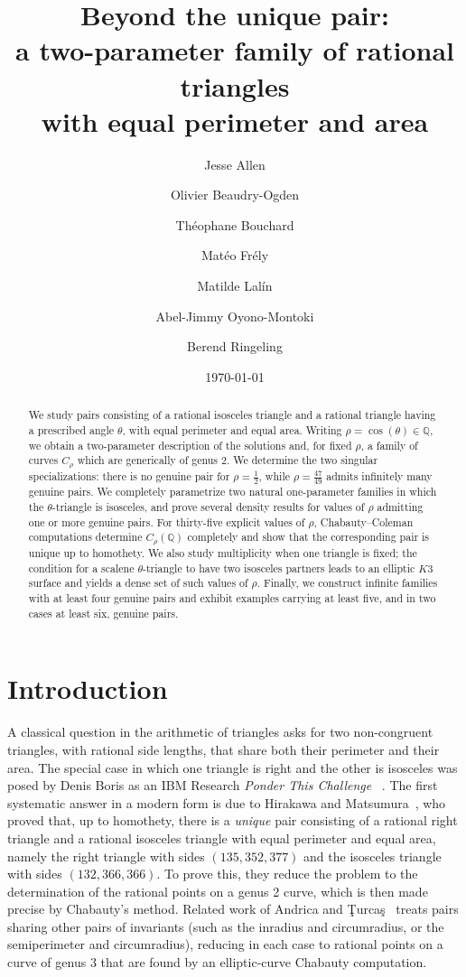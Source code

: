 \documentclass[11pt]{amsart}
\title[A two-parameter family of rational triangles
       with equal perimeter and area] {Beyond the unique pair:\\
       a two-parameter family of rational triangles\\
       with equal perimeter and area}
\author[Allen]{Jesse Allen}
\author[Beaudry-Ogden]{Olivier Beaudry-Ogden}
\author[Bouchard]{Th\'eophane Bouchard}
\author[Fr\'ely]{Mat\'eo Fr\'ely}
\author[Lal\'in]{Matilde Lal\'in}
\author[Oyono-Montoki]{Abel-Jimmy Oyono-Montoki}
\author[Ringeling]{Berend Ringeling}
\date{\today}
\theoremstyle{plain}
\theoremstyle{remark}
\theoremstyle{plain}
\newcommand{\Q}{\mathbb{Q}}
\begin{document}


\maketitle
\begin{abstract}
We study pairs consisting of a rational isosceles triangle and a
rational triangle having a prescribed angle $\theta$, with equal
perimeter and equal area. Writing $\rho=\cos(\theta)\in\Q$, we obtain a
two-parameter description of the solutions and, for fixed $\rho$, a
family of curves $C_\rho$ which are generically of genus $2$. We
determine the two singular specializations: there is no genuine pair
for $\rho=\frac12$, while $\rho=\frac{47}{49}$ admits infinitely many
genuine pairs. We completely parametrize two natural one-parameter
families in which the $\theta$-triangle is isosceles, and prove several
density results for values of $\rho$ admitting one or more genuine
pairs. For thirty-five explicit values of $\rho$, Chabauty--Coleman
computations determine $C_\rho(\Q)$ completely and show that the
corresponding pair is unique up to homothety. We also study multiplicity when one
triangle is fixed; the condition for a scalene $\theta$-triangle to
have two isosceles partners leads to an elliptic $K3$ surface and
yields a dense set of such values of $\rho$.
Finally, we construct infinite families with at least four genuine
pairs and exhibit examples carrying at least five, and in two cases
at least six, genuine pairs.
\end{abstract}

\section{Introduction}
\label{sec:intro}


A classical question in the arithmetic of triangles asks for two non-congruent
triangles, with rational side lengths, that share both their perimeter and their
area. The special case in which one triangle is right and the other is isosceles was posed by Denis Boris as an IBM Research \emph{Ponder This Challenge}  ~\cite{IBMPonderThis2004}. The first systematic answer in a modern form is
due to Hirakawa and Matsumura~\cite{HirakawaMatsumura, HirakawaMatsumura-corr}, who proved that, up to homothety, there is a
\emph{unique} pair consisting of a rational right triangle and a rational
isosceles triangle with equal perimeter and equal area, namely the right triangle
with sides $(135,352,377)$ and the isosceles triangle with sides
$(132,366,366)$. To prove this, they reduce the problem to the determination of the rational points on a genus 2 curve, which is then made precise by
 Chabauty's method. Related work of
Andrica and \c{T}urca\c{s}~\cite{AndricaTurcas} treats pairs sharing other pairs
of invariants (such as the inradius and circumradius, or the semiperimeter and
circumradius), reducing in each case to rational points on a curve of genus $3$
that are found by an elliptic-curve Chabauty computation.
\end{document}
